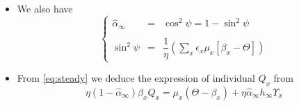 \documentclass[aps,onecolumn,10pt]{revtex4}
\begin{document}
\begin{itemize}
\item We also have
\begin{equation}
\left\lbrace
	\begin{array}{rcl}
	\hat\alpha_\infty & = & \cos^2 \psi = 1-\sin^2\psi\\
	\\
	\sin^2\psi & = & \dfrac{1}{\eta} \left( \sum_x \epsilon_x \mu_x \left[\beta_x - \Theta\right]\right)
	\end{array}
\right.
\end{equation}

\item From \eqref{eq:steady} we deduce the expression of individual $Q_x$ from
\begin{equation}
	\label{eq:Qx}
	\eta \left(1-\hat\alpha_\infty\right) \beta_x Q_x = \mu_x \left(\Theta-\beta_x\right) + \eta \hat\alpha_\infty h_\infty \Upsilon_x
\end{equation}
\end{itemize}
\end{document}
